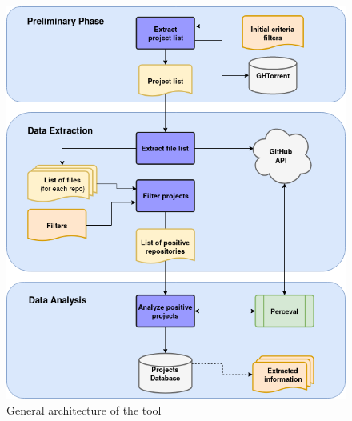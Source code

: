 \documentclass[a4paper, 12pt]{book}
\begin{document}
\begin{figure}
  \centering
  \includegraphics[width=15cm, keepaspectratio]{img/generic-tool-diagram-sections}
  \caption{General architecture of the tool}
  \label{fig:arquitectura}
\end{figure}
\end{document}
